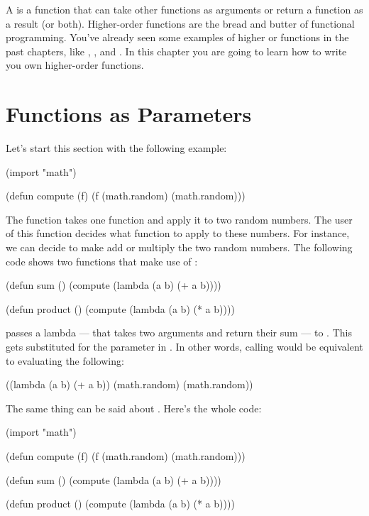 A  is a function that can take other functions as arguments or return a function as a result (or both). Higher-order functions are the bread and butter of functional programming. You've already seen some examples of higher or functions in the past chapters, like , , and . In this chapter you are going to learn how to write you own higher-order functions.

\section{Functions as Parameters}
Let's start this section with the following example:

\begin{REPL}
(import "math")

(defun compute (f) 
  (f (math.random) (math.random)))
\end{REPL}

The  function takes one function and apply it to two random numbers. The user of this function decides what function to apply to these numbers. For instance, we can decide to make  add or multiply the two random numbers. The following code shows two functions that make use of :

\begin{REPL}
(defun sum ()
  (compute (lambda (a b) (+ a b))))
  
(defun product ()
  (compute (lambda (a b) (* a b))))
\end{REPL}

 passes a lambda --- that takes two arguments and return their sum --- to . This gets substituted for the parameter  in . In other words, calling  would be equivalent to evaluating the following:

\begin{REPL}
((lambda (a b) (+ a b)) 
	(math.random) (math.random))
\end{REPL}

The same thing can be said about . Here's the whole code:
\begin{REPL}
(import "math")

(defun compute (f) 
  (f (math.random) (math.random)))

(defun sum ()
  (compute (lambda (a b) (+ a b))))

(defun product ()
  (compute (lambda (a b) (* a b))))
\end{REPL}

